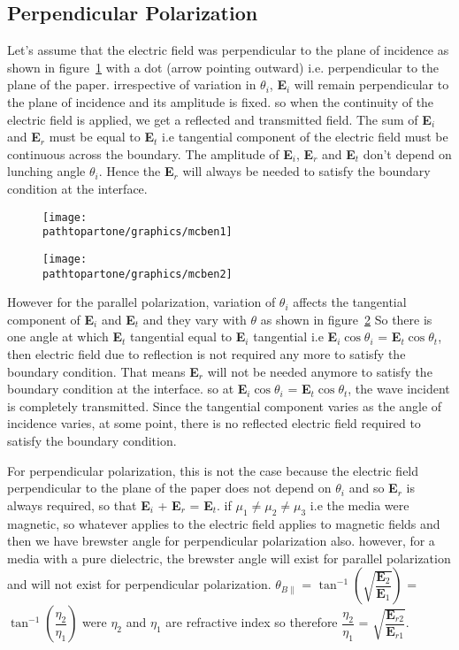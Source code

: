 \subsection{Perpendicular Polarization}
Let's assume that the electric field was perpendicular to the plane of incidence as shown in figure~\ref{fig:mcben1} with a dot (arrow pointing outward) i.e. perpendicular to the plane of the paper. irrespective of variation in $\theta_i$, \textbf{E}$_i$ will remain perpendicular to the plane of incidence and its amplitude is fixed. so when the continuity of the electric field is applied, we get a reflected and transmitted field. The sum of \textbf{E}$_i$ and \textbf{E}$_r$ must be equal to \textbf{E}$_t$ i.e tangential component of the electric field must be continuous across the boundary. The amplitude of \textbf{E}$_i$, \textbf{E}$_r$ and \textbf{E}$_t$ don't depend on lunching angle $\theta_i$. Hence the \textbf{E}$_r$ will always be needed to satisfy the boundary condition at the interface.
\begin{figure}[h]
\centering
\texttt{[image: \\pathtopartone/graphics/mcben1]}
\caption{}
\label{fig:mcben1}
\end{figure}
\begin{figure}[h]
\centering
\texttt{[image: \\pathtopartone/graphics/mcben2]}
\caption{}
\label{fig:mcben2}
\end{figure}	

However for the parallel polarization, variation of $\theta_i$ affects the tangential component of \textbf{E}$_i$ and \textbf{E}$_t$ and they vary with $\theta$ as shown in figure~\ref{fig:mcben2} So there is one angle at which \textbf{E}$_t$ tangential equal to \textbf{E}$_i$ tangential i.e \textbf{E}$_i\cos\theta_i$ = \textbf{E}$_t\cos\theta_t$, then electric field due to reflection is not required any more to satisfy the boundary condition. That means \textbf{E}$_r$ will not be needed anymore to satisfy the boundary condition at the interface. so at \textbf{E}$_i\cos\theta_i$ = \textbf{E}$_t\cos\theta_t$, the wave incident is completely transmitted. Since the tangential component varies as the angle of incidence varies, at some point, there is no reflected electric field required to satisfy the boundary condition.

For perpendicular polarization, this is not the case because the electric field perpendicular to the plane of the paper does not depend on $\theta_i$ and so \textbf{E}$_r$ is always required, so that \textbf{E}$_i$ + \textbf{E}$_r$ = \textbf{E}$_t$. if $\mu_1 \neq \mu_2 \neq \mu_3$ i.e the media were magnetic, so whatever applies to the electric field applies to magnetic fields and then we have brewster angle for perpendicular polarization also. however, for a media with a pure dielectric, the brewster angle will exist for parallel polarization and will not exist for perpendicular polarization. $\theta_{B\parallel}$ = $\tan^{-1}\left(\sqrt{\dfrac{\textbf{E}_2}{\textbf{E}_1}}\right)$ = $\tan^{-1}\left(\dfrac{\eta_2}{\eta_1}\right)$ were $\eta_2$ and $\eta_1$ are refractive index so therefore $\dfrac{\eta_2}{\eta_1}$ = $\sqrt{\dfrac{\textbf{E}_{r2}}{\textbf{E}_{r1}}}$.

